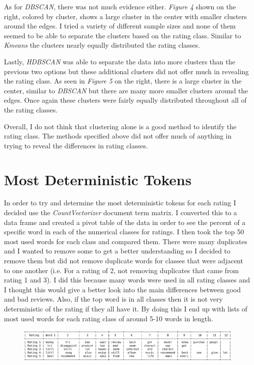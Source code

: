\documentclass[a4paper, 11pt]{article}
\begin{document}
\noindent
As for \emph{DBSCAN}, there was not much evidence either. \emph{Figure 4} shown on the right, colored by cluster, shows a large cluster in the center with smaller clusters around the edges. I tried a variety of different sample sizes and none of them seemed to be able to separate the clusters based on the rating class. Similar to \emph{Kmeans} the clusters nearly equally distributed the rating classes.

\noindent
Lastly, \emph{HDBSCAN} was able to separate the data into more clusters than the previous two options but these additional clusters did not offer much in revealing the rating class. As seen in \emph{Figure 5} on the right, there is a large cluster in the center, similar to \emph{DBSCAN} but there are many more smaller clusters around the edges. Once again these clusters were fairly equally distributed throughout all of the rating classes. 

\noindent
Overall, I do not think that clustering alone is a good method to identify the rating class. The methods specified above did not offer much of anything in trying to reveal the differences in rating classes. 

\section*{Most Deterministic Tokens}
\noindent
In order to try and determine the most deterministic tokens for each rating I decided use the \emph{CountVectorizer} document term matrix. I converted this to a data frame and created a pivot table of the data in order to see the percent of a specific word in each of the numerical classes for ratings. I then took the top 50 most used words for each class and compared them. There were many duplicates and I wanted to remove some to get a better understanding so I decided to remove them but did not remove duplicate words for classes that were adjacent to one another (i.e. For a rating of 2, not removing duplicates that came from rating 1 and 3). I did this because many words were used in all rating classes and I thought this would give a better look into the main differences between good and bad reviews. Also, if the top word is in all classes then it is not very deterministic of the rating if they all have it. By doing this I end up with lists of most used words for each rating class of around 5-10 words in length. 

\begin{figure}[h]
  \includegraphics[width=\linewidth]{DetermTokens1.png}
\end{figure}
\end{document}
